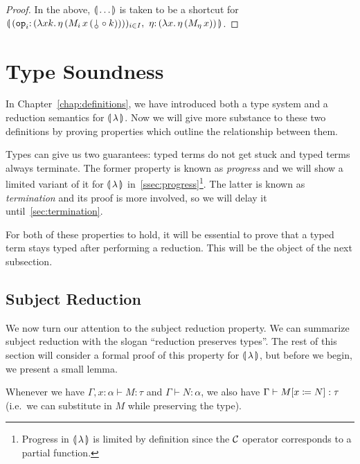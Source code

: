 \begin{proof}
  In the above, $\llparenthesis \, \ldots \, \rrparenthesis$ is taken to be a shortcut for
  $\banana{(\onto{\op{op}_i}{(\lam{x
        k}{\ap{\eta}{(\ap{\ap{M_i}{x}}{(\cherry \circ k)})}})})_{i \in I},\
    \onto{\eta}{(\lam{x}{\etaE{(\ap{M_\eta}{x})}})}}$.
\end{proof}


\section{Type Soundness}
\label{sec:type-soundness}

In Chapter~\ref{chap:definitions}, we have introduced both a type system
and a reduction semantics for $\llparenthesis \, \lambda \, \rrparenthesis$. Now we will give more
substance to these two definitions by proving properties which outline the
relationship between them.

Types can give us two guarantees: typed terms do not get stuck and typed
terms always terminate. The former property is known as \emph{progress} and
we will show a limited variant of it for $\llparenthesis \, \lambda \, \rrparenthesis$
in~\ref{ssec:progress}\footnote{Progress in $\llparenthesis \, \lambda \, \rrparenthesis$ is limited
  by definition since the $\mathcal{C}$ operator corresponds to a partial
  function.}. The latter is known as \emph{termination} and its proof is
more involved, so we will delay it until~\ref{sec:termination}.

For both of these properties to hold, it will be essential to prove that a
typed term stays typed after performing a reduction. This will be the
object of the next subsection.


\subsection{Subject Reduction}
\label{ssec:subject-reduction}

We now turn our attention to the subject reduction property. We can
summarize subject reduction with the slogan ``reduction preserves
types''. The rest of this section will consider a formal proof of this
property for $\llparenthesis \, \lambda \, \rrparenthesis$, but before we begin, we present a small
lemma.

\begin{lemma}\label{lem:substitution-types}
  
  Whenever we have $\Gamma, x : \alpha \vdash M : \tau$ and
  $\Gamma \vdash N : \alpha$, we also have
  $\Gamma \vdash M[x \coloneqq N] : \tau$ (i.e.\ we can substitute in $M$
  while preserving the type).
\end{lemma}

